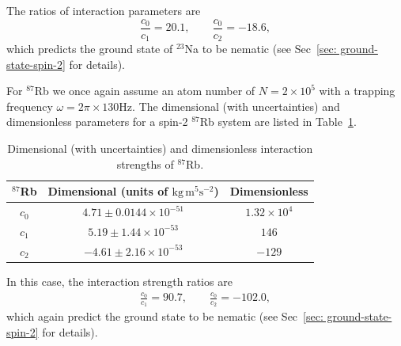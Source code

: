 The ratios of interaction parameters are
\begin{equation}
    \frac{c_0}{c_1} = 20.1, \qquad \frac{c_0}{c_2} = -18.6,
\end{equation}
which predicts the ground state of \( ^{23}\)Na to be nematic (see
Sec~\ref{sec: ground-state-spin-2} for details).

For \( ^{87}\)Rb we once again assume an atom number of \(N=2\times10^5\) with a
trapping frequency \(\omega = 2\pi \times 130\)Hz.
The dimensional (with uncertainties) and dimensionless parameters for a spin-2
\( ^{87}\)Rb system are listed in
Table~\ref{table: spin-2-interactions-rb87}.
\begin{table}[!htbp]
    \centering
    \begin{tabular}{ccc}
        \toprule
        \( ^{87}\)Rb & Dimensional (units of \(\text{kg}\, \text{m}^5
        \text{s}^{-2} \)) & Dimensionless \\
        \midrule
        \(c_0\) & \(4.71 \pm 0.0144 \times 10^{-51}\) & \(1.32\times10^4\) \\
        \(c_1\) & \(5.19 \pm 1.44 \times 10^{-53}\) & \(146\) \\
        \(c_2\) & \(-4.61 \pm 2.16 \times 10^{-53}\) & \(-129\) \\
        \bottomrule
    \end{tabular}
    \caption{\label{table: spin-2-interactions-rb87}Dimensional (with
    uncertainties) and dimensionless interaction strengths of \( ^{87}\)Rb.}
\end{table}
In this case, the interaction strength ratios are
\begin{align}
    \frac{c_0}{c_1} = 90.7, \qquad \frac{c_0}{c_2} = -102.0,
\end{align}
which again predict the ground state to be nematic (see
Sec~\ref{sec: ground-state-spin-2} for details).
